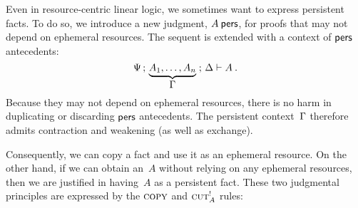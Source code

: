 Even in resource-centric linear logic, we sometimes want to express persistent facts.
To do so, we introduce a new judgment, $A \pers$, for proofs that may not depend on ephemeral resources.
The sequent is extended with a context of $\pers$ antecedents:
\begin{equation*}
  \Psi \,;\, \underbrace{A_1, \dotsc, A_n}_{\displaystyle \Gamma} \;;\, \Delta \vdash A \:.
\end{equation*}
Because they may not depend on ephemeral resources, there is no harm in duplicating or discarding $\pers$ antecedents.
The persistent context~$\Gamma$ therefore admits contraction and weakening (as well as exchange).

Consequently, we can
copy a fact and use it as an ephemeral resource.
On the other hand, if we can obtain an~$A$ without relying on any ephemeral resources, then we are justified in having~$A$ as a persistent fact.
These two judgmental principles are expressed by the $\text{\normalfont\scshape copy}$ and $\text{\normalfont\scshape cut$^{\mathord{\text{!}}}_A$}$ rules:

